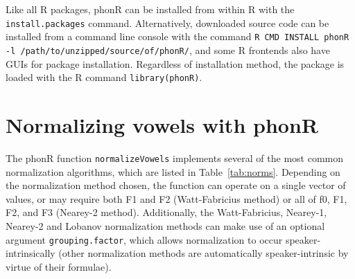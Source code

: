 \documentclass[12pt,oneside]{article}
\begin{document}
Like all R packages, phonR can be installed from within R with the \texttt{install.packages} command.  Alternatively, downloaded source code can be installed from a command line console with the command \texttt{R CMD INSTALL phonR -l /path/to/unzipped/source/of/phonR/}, and some R frontends also have GUIs for package installation.  Regardless of installation method, the package is loaded with the R command \texttt{library(phonR)}.

\section{Normalizing vowels with phonR}
The phonR function \texttt{normalizeVowels} implements several of the most common normalization algorithms, which are listed in Table~\ref{tab:norms}.  Depending on the normalization method chosen, the function can operate on a single vector of values, or may require both F1 and F2 (Watt-Fabricius method) or all of f0, F1, F2, and F3 (Nearey-2 method).  Additionally, the Watt-Fabricius, Nearey-1, Nearey-2 and Lobanov normalization methods can make use of an optional argument \texttt{grouping.factor}, which allows normalization to occur speaker-intrinsically (other normalization methods are automatically speaker-intrinsic by virtue of their formulae).
\end{document}
